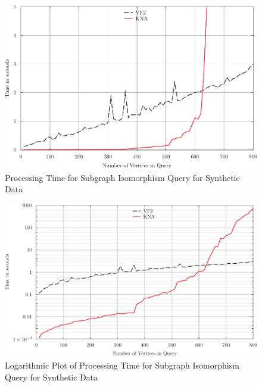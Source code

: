 
%
\begin{figure}[h]
\centering
\centerline{\includegraphics{images/kna_non_inducedS}}
\caption{Processing Time for Subgraph Isomorphism Query for Synthetic Data}
\label{fig:fig9}
\end{figure}

\begin{figure}[h]
\centering
\centerline{\includegraphics{images/kna_non_induced_logS}}
\caption{Logarithmic Plot of Processing Time for Subgraph Isomorphism Query for Synthetic Data}
\label{fig:fig10}
\end{figure}

